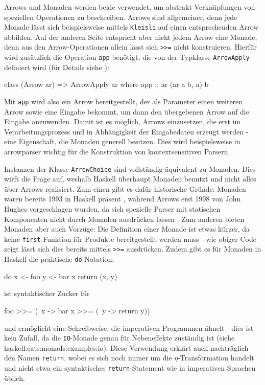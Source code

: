 \documentclass[11pt, a4paper, bibgerm]{scrbook}
\newcommand\icode[1]{\lstinline?#1?}
\newcommand\sref{}
\begin{document}
Arrows und Monaden werden beide verwendet, um abstrakt Verknüpfungen von
speziellen Operationen zu beschreiben. Arrows sind allgemeiner, denn
jede Monade lässt sich beispielsweise mittels \icode{Kleisli} auf einen
entsprechenden Arrow abbilden. Auf der anderen Seite entspricht aber
nicht jedem Arrow eine Monade, denn aus den Arrow-Operationen allein
lässt sich \icode{>>=} %
nicht konstruieren. Hierfür wird zusätzlich die Operation \icode{app}
benötigt, die von der Typklasse \icode{ArrowApply} definiert wird (für
Details siehe \cite[S. 18f]{Hughes}):
\begin{code}
class (Arrow ar) => ArrowApply ar where
  app :: ar (ar a b, a) b
\end{code}
Mit \icode{app} wird also ein Arrow bereitgestellt, der als Parameter
einen weiteren Arrow sowie eine Eingabe bekommt, um dann den übergebenen
Arrow auf die Eingabe anzuwenden. Damit ist es möglich, Arrows
einzusetzen, die erst im Verarbeitungsprozess und in Abhängigkeit der
Eingabedaten erzeugt werden - eine Eigenschaft, die Monaden generell
besitzen. Dies wird beispielsweise in \sref{arrowparser} wichtig für
die Konstruktion von kontextsensitiven Parsern.

Instanzen der Klasse \icode{ArrowChoice} sind vollständig äquivalent zu
Monaden.  Dies wirft die Frage auf, weshalb Haskell überhaupt Monaden
benutzt und nicht alles über Arrows realisiert. Zum einen gibt es dafür
historische Gründe: Monaden waren bereits 1993 in Haskell präsent
\cite[S.23ff]{HaskellHistory}, während Arrows erst 1998 von John Hughes
vorgeschlagen wurden, da sich spezielle Parser mit statischen
Komponenten nicht durch Monaden ausdrücken lassen \cite{Hughes}. Zum
anderen bieten Monaden aber auch Vorzüge: Die Definition einer Monade
ist etwas kürzer, da keine \icode{first}-Funktion für Produkte
bereitgestellt werden muss - wie obiger Code zeigt lässt sich dies
bereits mittels \icode{>>=} %
ausdrücken. Zudem gibt es für Monaden in Haskell die praktische
\icode{do}-Notation:
\begin{code}
do x <- foo
   y <- bar x
   return (x, y)
\end{code}
ist syntaktischer Zucker für
\begin{code}
foo >>= (\ x ->
  bar x >>= (\ y ->
    return y))
\end{code} %
und ermöglicht eine Schreibweise, die imperativen Programmen ähnelt -
dies ist kein Zufall, da die \icode{IO}-Monade genau für Nebeneffekte
zuständig ist (siehe \sref{haskell:cats:monads:examples:io}). Diese
Verwendung erklärt auch nachträglich den Namen \icode{return}, wobei es
sich noch immer um die $\eta$-Transformation handelt und nicht etwa ein
syntaktisches \icode{return}-Statement wie in imperativen Sprachen
üblich.
\end{document}
